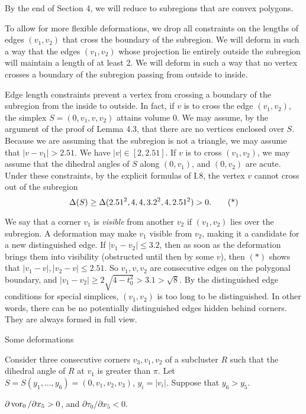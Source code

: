 By the end of Section 4, we will reduce to subregions that are
convex polygons.  

To allow for more flexible deformations, we drop all constraints
on the lengths of edges $(v_1,v_2)$ that cross the boundary of
the subregion.  We will deform in such a way that the edges
$(v_1,v_2)$ whose projection lie entirely outside the subregion
will maintain a length of at least 2.
We will deform in such a way that no vertex  crosses a boundary
of the subregion passing from outside to inside.
\endproclaim

Edge length constraints prevent a vertex from crossing a boundary
of the subregion from the inside to outside.  In fact, if $v$ is
to cross the edge $(v_1,v_2)$, the simplex $S=(0,v_1,v,v_2)$
attains volume 0.  We may assume, by the argument of the
proof of Lemma 4.3, that there are no vertices enclosed over $S$.
 Because we are assuming that the subregion
is not a triangle, we may assume that $|v-v_1|>2.51$.
We have $|v|\in[2,2.51]$.  If $v$ is to cross $(v_1,v_2)$, we may
assume that the dihedral angles of $S$ along $(0,v_1)$, and $(0,v_2)$
are acute.  Under these constraints, by the explicit formulas of
I.8, the vertex $v$ cannot cross out of the subregion
$$\Delta(S)\ge \Delta(2.51^2,4,4,3.2^2,4,2.51^2)>0.\tag*$$

We say that a corner $v_1$ is {\it visible} 
from another $v_2$ if $(v_1,v_2)$
lies over the subregion.  A deformation may make $v_1$ visible 
from $v_2$,
 making it a candidate for a new distinguished edge.
If $|v_1-v_2|\le 3.2$, then as soon as the deformation brings
them into visibility (obstructed until then by some $v$), 
then $(*)$ shows that $|v_1-v|,|v_2-v|\le2.51$.
So $v_1,v,v_2$ are consecutive edges on the polygonal boundary,
and $|v_1-v_2|\ge 2\sqrt{4-t_0^2} > 3.1>\sqrt{8}$.
By the distinguished edge conditions for special simplices, 
$(v_1,v_2)$ is too long to be
distinguished.  In other words, there can be
no potentially distinguished edges hidden behind corners. They
are always formed in full view.

\subhead {} Some deformations\endsubhead

Consider three consecutive corners $v_3,v_1,v_2$ of a subcluster
$R$ such that the dihedral angle of $R$ at $v_1$ is greater than
$\pi$.  Let $S=S(y_1,\ldots,y_6)=(0,v_1,v_2,v_3)$, $y_i=|v_i|$.
Suppose that $y_6>y_5$. 

  $\partial \operatorname{vor}_0/\partial x_5 >0$, and
$\partial \tau_0/\partial x_5<0$.
\endproclaim

